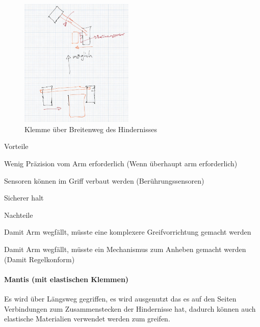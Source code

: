 \documentclass[../main.tex]{subfiles}
\begin{document}
\begin{figure}[h]
        \centering
        \includegraphics[width=0.48\textwidth]{img/technologierecherche/Aufnahme/Breiterweg_Griff.jpg}
        \caption{Klemme über Breitenweg des Hindernisses}
        \label{img:tech_Breiterweg_Griff}
\end{figure}

\begin{minipage}[t]{0.48\textwidth}
    \begin{items}
          \item [Vorteile]
          \item Wenig Präzision vom Arm erforderlich (Wenn überhaupt arm erforderlich)
          \item Sensoren können im Griff verbaut werden (Berührungssensoren)
          \item Sicherer halt
    \end{items}
\end{minipage}
\hfill
\begin{minipage}[t]{0.48\textwidth}
    \begin{items}
          \item [Nachteile]
          \item Damit Arm wegfällt, müsste eine komplexere Greifvorrichtung gemacht werden
          \item Damit Arm wegfällt, müsste ein Mechanismus zum Anheben gemacht werden (Damit Regelkonform)
    \end{items}
\end{minipage}
\newpage
\paragraph{Mantis (mit elastischen Klemmen)}
Es wird über Längsweg gegriffen, es wird ausgenutzt das es auf den Seiten Verbindungen zum Zusammenstecken der Hindernisse hat, dadurch können auch elastische Materialien verwendet werden zum greifen.
\end{document}
